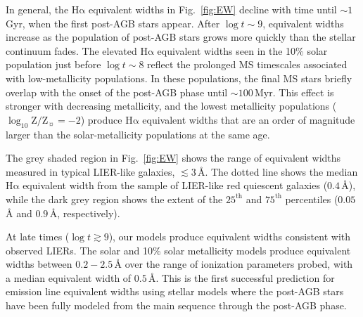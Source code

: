 \documentclass[preprint2]{aastex62}
\newcommand{\ha}{\ensuremath{\mathrm{H\alpha}}\xspace}
\newcommand{\logten}{\ensuremath{\log_{10}}}
\newcommand{\logZeq}[1]{\ensuremath{\logten \mathrm{Z}/\mathrm{Z}_{\sun} = #1}}
\newcommand{\ang}{\ensuremath{\mbox{\AA}}\xspace}
\newcommand{\Myr}{$\,$Myr\xspace}
\newcommand{\Gyr}{$\,$Gyr\xspace}
\begin{document}
In general, the \ha equivalent widths in Fig.~\ref{fig:EW} decline with time until ${\sim}1$\Gyr, when the first post-AGB stars appear. After $\log t \sim 9$, equivalent widths increase as the population of post-AGB stars grows more quickly than the stellar continuum fades. The elevated \ha equivalent widths seen in the 10\% solar population just before $\log t \sim 8$ reflect the prolonged MS timescales associated with low-metallicity populations. In these populations, the final MS stars briefly overlap with the onset of the post-AGB phase until ${\sim}100$\Myr. This effect is stronger with decreasing metallicity, and the lowest metallicity populations (\logZeq{-2}) produce \ha equivalent widths that are an order of magnitude larger than the solar-metallicity populations at the same age.

The grey shaded region in Fig.~\ref{fig:EW} shows the range of equivalent widths measured in typical LIER-like galaxies, $\lesssim 3\,$\ang \citep{CidFernandes+2011}. The dotted line shows the median \ha equivalent width from the \citet{Yan+2018} sample of LIER-like red quiescent galaxies ($0.4\,$\ang), while the dark grey region shows the extent of the $25^{\mathrm{th}}$ and $75^{\mathrm{th}}$ percentiles ($0.05\,$\ang and $0.9\,$\ang, respectively).

At late times ($\log t \gtrsim 9$), our models produce equivalent widths consistent with observed LIERs. The solar and 10\% solar metallicity models produce equivalent widths between $0.2 - 2.5\,$\ang over the range of ionization parameters probed, with a median equivalent width of $0.5\,$\ang. This is the first successful prediction for emission line equivalent widths using stellar models where the post-AGB stars have been fully modeled from the main sequence through the post-AGB phase.
\end{document}
